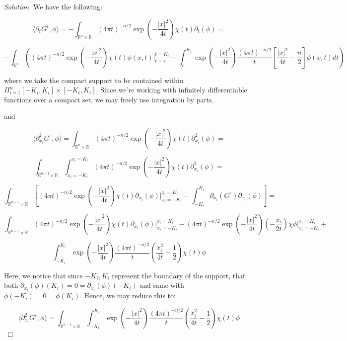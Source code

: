 \documentclass[10pt]{article}
\begin{document}
\begin{proof}[Solution]
We have the following:

$$ \langle \partial_t G^\epsilon, \phi \rangle = - \int_{\mathbb{R}^n \times \mathbb{R}} (4\pi t)^{-n/2} \exp\left(-\frac{| x|^2}{4t}\right) \chi(t) \partial_t(\phi) = $$

$$- \int_{\mathbb{R}^n} \left( (4\pi t)^{-n/2} \exp\left(-\frac{| x|^2}{4t}\right) \chi(t) \phi(x,t) \bigg|_{t=\epsilon}^{t=K_t} - \int_{\epsilon}^{K_t} \exp\left(-\frac{| x|^2}{4t}\right) \frac{(4\pi t)^{-n/2}}{t} \left[ \frac{|x|^2}{4t} - \frac{n}{2} \right] \phi(x,t) dt  \right)$$

where we take the compact support to be contained within $\Pi_{i=1}^n [-K_{i}, K_{i}] \times [-K_t, K_t] $. Since we’re working with infinitely differentiable functions over a compact set, we may freely use integration by parts.

and

$$ \langle \partial_{x_i}^2 G^\epsilon, \phi \rangle = \int_{\mathbb{R}^n \times \mathbb{R}} (4\pi t)^{-n/2} \exp\left(-\frac{| x|^2}{4t}\right) \chi(t) \partial_{x_i}^2(\phi) = $$

$$ \int_{\mathbb{R}^{n-1} \times \mathbb{R}} \int_{x_i = -K_i}^{x_i = K_i} (4\pi t)^{-n/2} \exp\left(-\frac{| x|^2}{4t}\right) \chi(t) \partial_{x_i}^2(\phi)  = $$

$$ \int_{\mathbb{R}^{n-1} \times \mathbb{R}}  \left[ (4\pi t)^{-n/2} \exp\left(-\frac{| x|^2}{4t}\right) \chi(t) \partial_{x_i}(\phi) \bigg|_{x_i= -K_i}^{x_i = K_i}  - \int_{-K_i}^{K_i} \partial_{x_i}(G^\epsilon) \partial_{x_i}(\phi) \right] = $$

$$ \int_{\mathbb{R}^{n-1} \times \mathbb{R}}  (4\pi t)^{-n/2} \exp\left(-\frac{| x|^2}{4t}\right) \chi(t) \partial_{x_i}(\phi) \bigg|_{x_i= -K_i}^{x_i = K_i}  - (4\pi t)^{-n/2}\exp\left(-\frac{| x|^2}{4t}\right)\left( -\frac{x_i}{2t}\right) \chi \phi \bigg|_{x_i = -K_i}^{x_i = K_i} + $$

$$\int_{-K_i}^{K_i} \exp\left(-\frac{| x|^2}{4t}\right) \frac{(4\pi t)^{-n/2}}{t}  \left( \frac{x_i^2}{4t} - \frac{1}{2} \right) \chi(t) \phi $$

Here, we notice that since $-K_i, K_i$ represent the boundary of the support, that both $\partial_{x_i}(\phi)(K_i) = 0 = \partial_{x_i}(\phi)(-K_i)$ and same with $\phi(-K_i) = 0 = \phi(K_i)$. Hence, we may reduce this to:

$$ \langle \partial_{x_i}^2 G^\epsilon, \phi \rangle =  \int_{\mathbb{R}^{n-1} \times \mathbb{R}} \int_{-K_i}^{K_i} \exp\left(-\frac{| x|^2}{4t}\right) \frac{(4\pi t)^{-n/2}}{t}  \left( \frac{x_i^2}{4t} - \frac{1}{2} \right) \chi(t) \phi $$


\end{proof}
\end{document}
